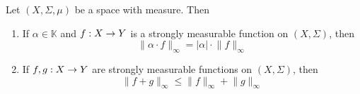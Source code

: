 \begin{proposition}\label{proposition:L_infinity_norm_is_seminorm}
    Let $(X,\Sigma,\mu)$ be a space with measure. Then
    \begin{enumerate}[label=\emph{\textbf{(\arabic*)}}, leftmargin=*]
        \item If $\alpha \in \mathbb{K}$ and $f:X\rightarrow Y$ is a strongly measurable function on $(X,\Sigma)$, then
              $$\lVert \alpha \cdot f\rVert_{\infty} = |\alpha|\cdot \lVert f\rVert_{\infty}$$
        \item If $f,g:X\rightarrow Y$ are strongly measurable functions on $(X,\Sigma)$, then
              $$\lVert f + g \rVert_{\infty} \leq \lVert f \rVert_{\infty} + \lVert g \rVert_{\infty}$$
    \end{enumerate}
\end{proposition}
